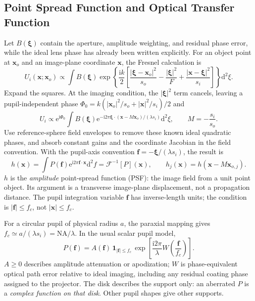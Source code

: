 \documentclass[11pt,a4paper]{article}
\numberwithin{equation}{section}
\newcommand{\dd}{\mathrm{d}}
\newcommand{\ii}{\mathrm{i}}
\newcommand{\ee}{\mathrm{e}}
\newcommand{\vct}[1]{\bm{#1}}
\newcommand{\FT}{\mathcal F}
\newcommand{\NA}{\mathrm{NA}}
\begin{document}
\subsection{Point Spread Function and Optical Transfer Function }
Let $B(\vct\xi)$ contain the aperture, amplitude weighting, and residual
phase error, while the ideal lens phase has already been written explicitly.
For an object point at $\vct x_o$ and an image-plane coordinate $\vct x$,
the Fresnel calculation is
\begin{equation}
U_i(\vct x;\vct x_o)\propto
\int B(\vct\xi)\exp\!\left\{\frac{\ii k}{2}
\left[\frac{|\vct\xi-\vct x_o|^2}{s_o}
-\frac{|\vct\xi|^2}{F}
+\frac{|\vct x-\vct\xi|^2}{s_i}\right]\right\}\dd^2\xi.
\label{eq:point-integral}
\end{equation}
Expand the squares. At the imaging condition, the $|\vct\xi|^2$ term
cancels, leaving a pupil-independent phase
$\Phi_0=k(|\vct x_o|^2/s_o+|\vct x|^2/s_i)/2$ and
\begin{equation}
U_i\propto\ee^{\ii\Phi_0}
\int B(\vct\xi)
\ee^{-\ii2\pi\vct\xi\cdot(\vct x-M\vct x_o)/(\lambda s_i)}\dd^2\xi,
\qquad M=-\frac{s_i}{s_o}.
\end{equation}
Use reference-sphere field envelopes to remove these known ideal
quadratic phases, and absorb constant gains and the coordinate Jacobian
in the field convention. With the pupil-axis convention
$\vct f=-\vct\xi/(\lambda s_i)$, the result is
\begin{equation}
\boxed{h(\vct x)=\int P(\vct f)\ee^{\ii2\pi\vct f\cdot\vct x}\dd^2f
=\FT^{-1}[P](\vct x),\qquad
h_j(\vct x)=h(\vct x-M\vct x_{o,j}).}
\label{eq:psf}
\end{equation}
$h$ is the \emph{amplitude} point-spread function (PSF): the image field
from a unit point object. Its argument is a transverse image-plane
displacement, not a propagation distance. The pupil integration variable
$\vct f$ has inverse-length units; the condition is $|\vct f|\leq f_c$,
not $|\vct x|\leq f_c$.

For a circular pupil of physical radius $a$, the paraxial mapping gives
$f_c\simeq a/(\lambda s_i)=\NA/\lambda$. In the usual scalar pupil model,
\begin{equation}
\boxed{P(\vct f)=A(\vct f)\,
\mathbf1_{|\vct f|\leq f_c}\,
\exp\!\left[\frac{\ii2\pi}{\lambda}
W\!\left(\frac{\vct f}{f_c}\right)\right].}
\label{eq:pupil}
\end{equation}
$A\geq0$ describes amplitude attenuation or apodization; $W$ is
phase-equivalent optical path error relative to ideal imaging, including
any residual coating phase assigned to the projector.
The disk describes the support only: an aberrated $P$ is a \emph{complex
function on that disk}. Other pupil shapes give other supports.
\end{document}
